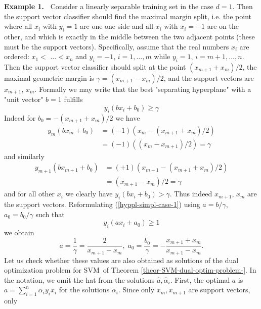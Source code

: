 \documentclass[11pt,twoside]{article}%
\theoremstyle{change}
\begin{document}
\textbf{Example 1.} \textbf{\ }Consider a linearly separable training set in
the case $d=1$. Then the support vector classifier should find the maximal
margin split, i.e. the point where all $x_{i}$ with $y_{i}=1$ are one one side
and all $x_{i}$ with $x_{i}=-1$ are on the other, and which is exactly in the
middle between the two adjacent points (these must be the support vectors).
Specifically, assume that the real numbers $x_{i}$ are ordered: $x_{1}<$
$\ldots<x_{n}$ and $y_{i}=-1$, $i=1,\ldots,m$ while $y_{i}=1$, $i=m+1,\ldots
,n$. Then the support vector classifier should split at the point $\left(
x_{m+1}+x_{m}\right)  /2$, the maximal geometric margin is $\gamma=\left(
x_{m+1}-x_{m}\right)  /2$, and the support vectors are $x_{m+1} $, $x_{m}$.
Formally we may write that the best "separating hyperplane" with a "unit
vector" $b=1$ fulfills%
\begin{equation}
y_{i}\left(  bx_{i}+b_{0}\right)  \geq\gamma\label{hyppl-simpl-case-1}%
\end{equation}
Indeed for $b_{0}=-\left(  x_{m+1}+x_{m}\right)  /2$ we have
\begin{align*}
y_{m}\left(  bx_{m}+b_{0}\right)   & =(-1)\left(  x_{m}-\left(  x_{m+1}%
+x_{m}\right)  /2\right) \\
& =(-1)\left(  \left(  x_{m}-x_{m+1}\right)  /2\right)  =\gamma
\end{align*}
and similarly
\begin{align*}
y_{m+1}\left(  bx_{m+1}+b_{0}\right)   & =(+1)\left(  x_{m+1}-\left(
x_{m+1}+x_{m}\right)  /2\right) \\
& =\left(  x_{m+1}-x_{m}\right)  /2=\gamma
\end{align*}
and for all other $x_{i}$ we clearly have $y_{i}\left(  bx_{i}+b_{0}\right)
>\gamma$. Thus indeed $x_{m+1}$, $x_{m}$ are the support vectors.
Reformulating (\ref{hyppl-simpl-case-1}) using $a=b/\gamma$, $a_{0}%
=b_{0}/\gamma$ such that
\[
y_{i}\left(  ax_{i}+a_{0}\right)  \geq1
\]
we obtain
\begin{equation}
a=\frac{1}{\gamma}=\frac{2}{x_{m+1}-x_{m}},\;a_{0}=\frac{b_{0}}{\gamma}%
=-\frac{x_{m+1}+x_{m}}{x_{m+1}-x_{m}}.\label{obvious-sol}%
\end{equation}
Let us check whether these values are also obtained as solutions of the dual
optimization problem for SVM\ of Theorem \ref{theor-SVM-dual-optim-problem-}.
In the notation, we omit the hat from the solutions $\hat{a},\hat{\alpha}_{i}%
$. First, the optimal $a$ is $a=\sum_{i=1}^{n}\alpha_{i}y_{i}x_{i}$ for the
solutions $\alpha_{i}$. Since only $x_{m},x_{m+1}$ are support vectors, only
\end{document}

